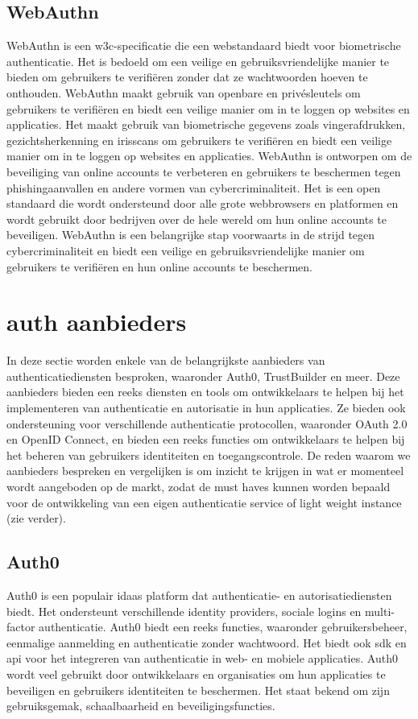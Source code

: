   \subsection{WebAuthn}%
  \label{subsec:webauthn}
  WebAuthn is een \gls{w3c}-specificatie die een webstandaard biedt voor biometrische authenticatie. Het is bedoeld om een veilige en gebruiksvriendelijke manier te bieden om gebruikers te verifiëren zonder dat ze wachtwoorden hoeven te onthouden. WebAuthn maakt gebruik van openbare en privésleutels om gebruikers te verifiëren en biedt een veilige manier om in te loggen op websites en applicaties. Het maakt gebruik van biometrische gegevens zoals vingerafdrukken, gezichtsherkenning en irisscans om gebruikers te verifiëren en biedt een veilige manier om in te loggen op websites en applicaties. WebAuthn is ontworpen om de beveiliging van online accounts te verbeteren en gebruikers te beschermen tegen phishingaanvallen en andere vormen van cybercriminaliteit. Het is een open standaard die wordt ondersteund door alle grote webbrowsers en platformen en wordt gebruikt door bedrijven over de hele wereld om hun online accounts te beveiligen. WebAuthn is een belangrijke stap voorwaarts in de strijd tegen cybercriminaliteit en biedt een veilige en gebruiksvriendelijke manier om gebruikers te verifiëren en hun online accounts te beschermen.
  
  
  
  \section{\gls{auth} aanbieders}%
  \label{sec:auth-aanbieders}
  In deze sectie worden enkele van de belangrijkste aanbieders van authenticatiediensten besproken, waaronder Auth0, TrustBuilder en meer. Deze aanbieders bieden een reeks diensten en tools om ontwikkelaars te helpen bij het implementeren van authenticatie en autorisatie in hun applicaties. Ze bieden ook ondersteuning voor verschillende authenticatie protocollen, waaronder OAuth 2.0 en OpenID Connect, en bieden een reeks functies om ontwikkelaars te helpen bij het beheren van gebruikers identiteiten en toegangscontrole.
  De reden waarom we aanbieders bespreken en vergelijken is om inzicht te krijgen in wat er momenteel wordt aangeboden op de markt, zodat de must haves kunnen worden bepaald voor de ontwikkeling van een eigen authenticatie service of light weight instance (zie verder).
  
  
  \subsection{Auth0}%
  \label{subsec:auth0}
  Auth0 is een populair \gls{idaas} platform dat authenticatie- en autorisatiediensten biedt. Het ondersteunt verschillende identity providers, sociale logins en multi-factor authenticatie. Auth0 biedt een reeks functies, waaronder gebruikersbeheer, eenmalige aanmelding en authenticatie zonder wachtwoord. Het biedt ook \gls{sdk} en \gls{api} voor het integreren van authenticatie in web- en mobiele applicaties. Auth0 wordt veel gebruikt door ontwikkelaars en organisaties om hun applicaties te beveiligen en gebruikers identiteiten te beschermen. Het staat bekend om zijn gebruiksgemak, schaalbaarheid en beveiligingsfuncties.

